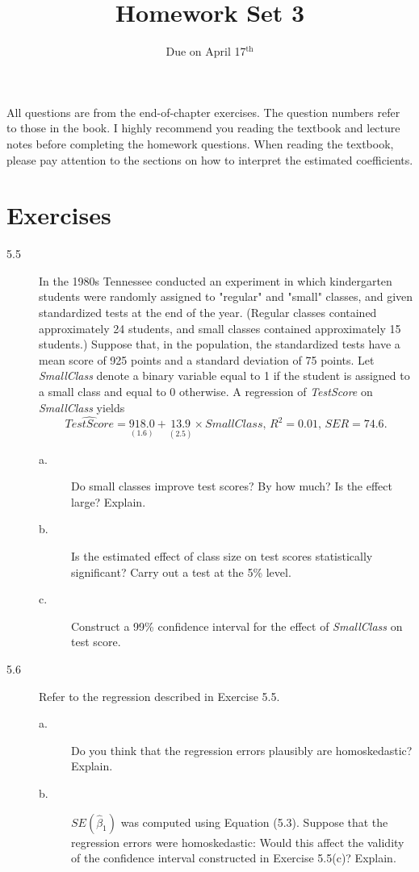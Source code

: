 \documentclass[a4paper,11pt]{article}
\date{Due on April 17\(^{\text{th}}\)}
\title{Homework Set 3}
\begin{document}
\maketitle
All questions are from the end-of-chapter exercises. The question
numbers refer to those in the book. I highly recommend you reading the
textbook and lecture notes before completing the homework
questions. When reading the textbook, please pay attention to the
sections on how to interpret the estimated coefficients.

\section*{Exercises}
\label{sec:org5f90c46}

\begin{description}
\item[{5.5}] In the 1980s Tennessee conducted an experiment in which
kindergarten students were randomly assigned to "regular" and
"small" classes, and given standardized tests at the end of
the year. (Regular classes contained approximately 24
students, and small classes contained approximately 15
students.) Suppose that, in the population, the standardized
tests have a mean score of 925 points and a standard
deviation of 75 points. Let \emph{SmallClass} denote a binary
variable equal to 1 if the student is assigned to a small
class and equal to 0 otherwise. A regression of \emph{TestScore}
on \emph{SmallClass} yields
\begin{equation*}
\widehat{TestScore} = \underset{\displaystyle (1.6)}{918.0} + \underset{\displaystyle (2.5)}{13.9} \times SmallClass,\, R^2 = 0.01,\, SER = 74.6.
\end{equation*}
\begin{description}
\item[{a.}] Do small classes improve test scores? By how much? Is the
effect large? Explain.
\item[{b.}] Is the estimated effect of class size on test scores
statistically significant? Carry out a test at the 5\% level.
\item[{c.}] Construct a 99\% confidence interval for the effect of
\emph{SmallClass} on test score.
\end{description}
\end{description}

\vspace{0.2cm}

\begin{description}
\item[{5.6}] Refer to the regression described in Exercise 5.5.
\begin{description}
\item[{a.}] Do you think that the regression errors plausibly are
homoskedastic? Explain.
\item[{b.}] \(SE(\hat{\beta}_1)\) was computed using Equation
(5.3). Suppose that the regression errors were
homoskedastic: Would this affect the validity of the
confidence interval constructed in Exercise 5.5(c)?
Explain.
\end{description}
\end{description}
\end{document}
